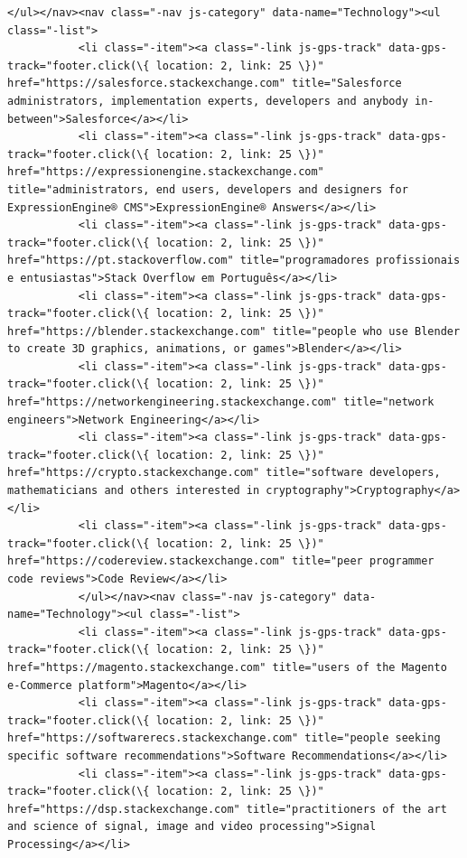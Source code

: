 \documentclass[11pt]{article}
\begin{document}
\begin{Verbatim}[commandchars=\\\{\}]
           </ul></nav><nav class="-nav js-category" data-name="Technology"><ul class="-list">
           <li class="-item"><a class="-link js-gps-track" data-gps-track="footer.click(\{ location: 2, link: 25 \})" href="https://salesforce.stackexchange.com" title="Salesforce administrators, implementation experts, developers and anybody in-between">Salesforce</a></li>
           <li class="-item"><a class="-link js-gps-track" data-gps-track="footer.click(\{ location: 2, link: 25 \})" href="https://expressionengine.stackexchange.com" title="administrators, end users, developers and designers for ExpressionEngine® CMS">ExpressionEngine® Answers</a></li>
           <li class="-item"><a class="-link js-gps-track" data-gps-track="footer.click(\{ location: 2, link: 25 \})" href="https://pt.stackoverflow.com" title="programadores profissionais e entusiastas">Stack Overflow em Português</a></li>
           <li class="-item"><a class="-link js-gps-track" data-gps-track="footer.click(\{ location: 2, link: 25 \})" href="https://blender.stackexchange.com" title="people who use Blender to create 3D graphics, animations, or games">Blender</a></li>
           <li class="-item"><a class="-link js-gps-track" data-gps-track="footer.click(\{ location: 2, link: 25 \})" href="https://networkengineering.stackexchange.com" title="network engineers">Network Engineering</a></li>
           <li class="-item"><a class="-link js-gps-track" data-gps-track="footer.click(\{ location: 2, link: 25 \})" href="https://crypto.stackexchange.com" title="software developers, mathematicians and others interested in cryptography">Cryptography</a></li>
           <li class="-item"><a class="-link js-gps-track" data-gps-track="footer.click(\{ location: 2, link: 25 \})" href="https://codereview.stackexchange.com" title="peer programmer code reviews">Code Review</a></li>
           </ul></nav><nav class="-nav js-category" data-name="Technology"><ul class="-list">
           <li class="-item"><a class="-link js-gps-track" data-gps-track="footer.click(\{ location: 2, link: 25 \})" href="https://magento.stackexchange.com" title="users of the Magento e-Commerce platform">Magento</a></li>
           <li class="-item"><a class="-link js-gps-track" data-gps-track="footer.click(\{ location: 2, link: 25 \})" href="https://softwarerecs.stackexchange.com" title="people seeking specific software recommendations">Software Recommendations</a></li>
           <li class="-item"><a class="-link js-gps-track" data-gps-track="footer.click(\{ location: 2, link: 25 \})" href="https://dsp.stackexchange.com" title="practitioners of the art and science of signal, image and video processing">Signal Processing</a></li>

\end{Verbatim}
\end{document}
